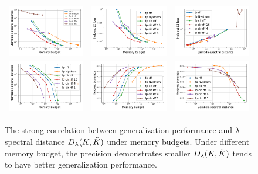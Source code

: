 \begin{figure}
	\centering
	\begin{tabular}{c c c}
		\includegraphics[width=0.33\linewidth]{figures/regression_delta_vs_mem.pdf} &
		\includegraphics[width=0.33\linewidth]{figures/regression_l2_vs_mem.pdf} &
		\includegraphics[width=0.33\linewidth]{figures/regression_l2_vs_delta.pdf} \\
		\includegraphics[width=0.33\linewidth]{figures/classification_delta_vs_mem.pdf} &
		\includegraphics[width=0.33\linewidth]{figures/classification_acc_vs_mem.pdf} &
		\includegraphics[width=0.33\linewidth]{figures/classification_acc_vs_delta.pdf} \\
	\end{tabular}
	\caption{The strong correlation between generalization performance and $\lambda$-spectral distance $D_{\lambda}(K,\tilde{K})$ under memory budgets. Under different memory budget, the precision demonstrates smaller $D_{\lambda}(K,\tilde{K})$ tends to have better generalization performance.}
	\label{fig:generalizatio_col}
\end{figure}


